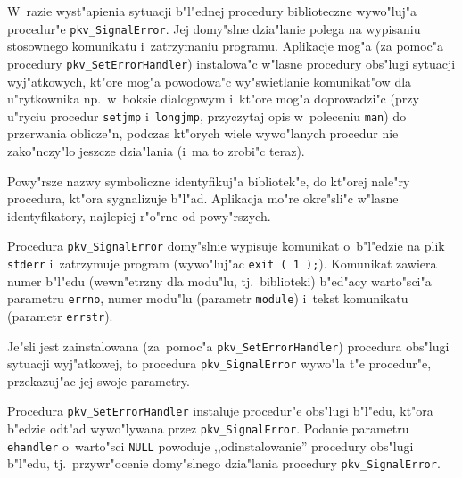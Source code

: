 W~razie wyst"apienia sytuacji b"l"ednej procedury biblioteczne
wywo"luj"a procedur"e \texttt{pkv\_SignalError}.
Jej domy"slne dzia"lanie polega na wypisaniu stosownego komunikatu
i~zatrzymaniu programu. Aplikacje mog"a (za pomoc"a procedury
\texttt{pkv\_SetErrorHandler}) instalowa"c w"lasne procedury obs"lugi
sytuacji wyj"atkowych, kt"ore mog"a powodowa"c wy"swietlanie komunikat"ow
dla u"rytkownika np.\ w~boksie dialogowym i~kt"ore mog"a doprowadzi"c (przy
u"ryciu procedur \texttt{setjmp} i~\texttt{longjmp}, przyczytaj opis
w~poleceniu \texttt{man}) do przerwania oblicze"n, podczas kt"orych wiele
wywo"lanych procedur nie zako"nczy"lo jeszcze dzia"lania (i~ma to zrobi"c
teraz).

\vspace{\bigskipamount}
Powy"rsze nazwy symboliczne identyfikuj"a bibliotek"e, do kt"orej nale"ry
procedura, kt"ora sygnalizuje b"l"ad. Aplikacja mo"re okre"sli"c w"lasne
identyfikatory, najlepiej r"o"rne od powy"rszych.

\vspace{\bigskipamount}
Procedura \texttt{pkv\_SignalError} domy"slnie wypisuje komunikat
o~b"l"edzie na plik \texttt{stderr} i~zatrzymuje program (wywo"luj"ac
\texttt{exit~(~1~);}). Komunikat zawiera numer b"l"edu (wewn"etrzny dla
modu"lu, tj.\ biblioteki) b"ed"acy warto"sci"a parametru \texttt{errno},
numer modu"lu (parametr \texttt{module}) i~tekst komunikatu (parametr
\texttt{errstr}).

Je"sli jest zainstalowana (za~pomoc"a \texttt{pkv\_SetErrorHandler})
procedura obs"lugi sytuacji wyj"atkowej, to procedura
\texttt{pkv\_SignalError} wywo"la t"e procedur"e, przekazuj"ac jej swoje
parametry.

\vspace{\bigskipamount}
Procedura \texttt{pkv\_SetErrorHandler} instaluje procedur"e obs"lugi
b"l"edu, kt"ora b"edzie odt"ad wywo"lywana przez \texttt{pkv\_SignalError}.
Podanie parametru \texttt{ehandler} o~warto"sci \texttt{NULL} powoduje
,,odinstalowanie'' procedury obs"lugi b"l"edu, tj.\ przywr"ocenie
domy"slnego dzia"lania procedury \texttt{pkv\_SignalError}.


